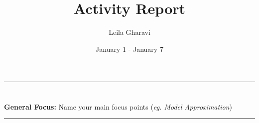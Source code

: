 \documentclass[12pt]{article}
\theoremstyle{definition}
\begin{document}
\title{\textcolor{ColorDef}{\textbf{Activity Report}}}   %
\author{Leila Gharavi}         %
\date{January 1 - January 7}   %
\maketitle
\vspace{-0.5cm}
\textcolor{ColorDef}{\hrule}
\vspace{-0.5cm}
\section*{}
\textbf{General Focus:} Name your main focus points (\emph{eg. Model Approximation})
\vspace{0.75cm}
\textcolor{ColorDef}{\hrule height 0.5pt}
\vspace{0.25cm}
\end{document}
